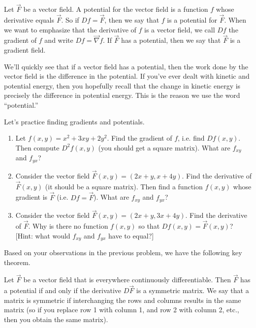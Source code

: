 \begin{definition}
%
 Let $\vec F$ be a vector field.  A potential for the vector field is a function $f$ whose derivative equals $\vec F$. So if $Df=\vec F$, then we say that $f$ is a potential for $\vec F$. When we want to emphasize that the derivative of $f$ is a vector field, we call $Df$ the gradient of $f$ and write $Df = \vec \nabla f$.
 If $\vec F$ has a potential, then we say that $\vec F$ is a gradient field. 
\end{definition}

We'll quickly see that if a vector field has a potential, then the work done by the vector field is the difference in the potential.  If you've ever dealt with kinetic and potential energy, then you hopefully recall that the change in kinetic energy is precisely the difference in potential energy.  This is the reason we use the word ``potential.''

\begin{problem}
%
Let's practice finding gradients and potentials.
\begin{enumerate}
 \item  Let $f(x,y) = x^2+3xy+2y^2$. Find the gradient of $f$, i.e. find $Df(x,y)$. Then compute $D^2f(x,y)$ (you should get a square matrix). What are $f_{xy}$ and $f_{yx}$?
 \item Consider the vector field $\vec F(x,y)=(2x+y,x+4y)$. Find the derivative of $\vec F(x,y)$ (it should be a square matrix). Then find a function $f(x,y)$ whose gradient is $\vec F$ (i.e. $Df=\vec F$). What are $f_{xy}$ and $f_{yx}$?
 \item {}%
Consider the vector field $\vec F(x,y)=(2x+y,3x+4y)$.  Find the derivative of $\vec F$.  Why is there no function $f(x,y)$ so that $Df(x,y)=\vec F(x,y)$? [Hint: what would $f_{xy}$ and $f_{yx}$ have to equal?] 
\end{enumerate}
\end{problem}

Based on your observations in the previous problem, we have the following key theorem.

\begin{theorem}
 Let $\vec F$ be a vector field that is everywhere continuously differentiable. Then $\vec F$ has a potential if and only if the derivative $D\vec F$ is a symmetric matrix. We say that a matrix is symmetric if interchanging the rows and columns results in the same matrix (so if you replace row 1 with column 1, and row 2 with column 2, etc., then you obtain the same matrix).  
\end{theorem}

